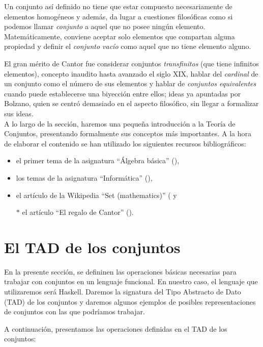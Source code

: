 Un conjunto así definido no tiene que estar compuesto necesariamente de
elementos homogéneos y además, da lugar a cuestiones filosóficas como si
podemos llamar \textit{conjunto} a aquel que no posee ningún elemento.
Matemáticamente, conviene aceptar solo elementos que compartan alguna propiedad
y definir el \textit{conjunto vacío} como aquel que no tiene elemento alguno.

El gran mérito de Cantor fue considerar conjuntos \textit{transfinitos} (que
tiene infinitos elementos), concepto inaudito hasta avanzado el siglo XIX,
hablar del \textit{cardinal} de un conjunto como el número de sus elementos y
hablar de \textit{conjuntos equivalentes} cuando puede establecerse una
biyección entre ellos; ideas ya apuntadas por Bolzano, quien se centró
demasiado en el aspecto filosófico, sin llegar a formalizar sus ideas.\\


A lo largo de la sección, haremos una pequeña introducción a la Teoría de
Conjuntos, presentando formalmente sus conceptos más importantes. A la hora de 
elaborar el contenido se han utilizado los siguientes recursos bibliográficos:

\begin{itemize}
\item el primer tema de la asignatura ``Álgebra básica'' (\cite{Algebra-15a}),
\item los temas de la asignatura ``Informática'' (\cite{Alonso-15a}),
\item el artículo de la Wikipedia ``Set (mathematics)''
  (\cite{Wikipedia-conjuntos} y
\item[$*$] el artículo ``El regalo de Cantor'' (\cite{Regalo-cantor}).
\end{itemize}

\section{El TAD de los conjuntos}

\label{sec:TAD_conjuntos}

En la presente sección, se defininen las operaciones básicas necesarias
para trabajar con conjuntos en un lenguaje funcional. En nuestro caso, 
el lenguaje que utilizaremos será Haskell. Daremos la signatura del Tipo
Abstracto de Dato (TAD) de los conjuntos y daremos algunos ejemplos de 
posibles representaciones de conjuntos con las que podríamos trabajar.

A continuación, presentamos las operaciones definidas en el TAD de los 
conjuntos:

